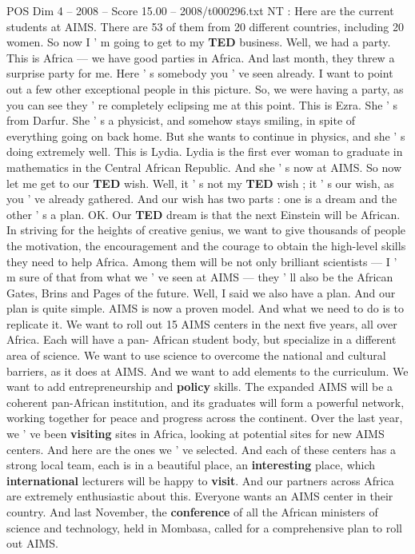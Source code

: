 \begin{textsample}{POS Dim 4 – 2008 – Score 15.00 – 2008/t000296.txt}
NT : Here are the current students at AIMS.
There are 53 of them from 20 different countries, including 20 women.
So now I ' m going to get to my \textbf{TED} business.
Well, we had a party.
This is Africa — we have good parties in Africa.
And last month, they threw a surprise party for me.
Here ' s somebody you ' ve seen already.
I want to point out a few other exceptional people in this picture.
So, we were having a party, as you can see they ' re completely eclipsing me at this point.
This is Ezra.
She ' s from Darfur.
She ' s a physicist, and somehow stays smiling, in spite of everything going on back home.
But she wants to continue in physics, and she ' s doing extremely well.
This is Lydia.
Lydia is the first ever woman to graduate in mathematics in the Central African Republic.
And she ' s now at AIMS.
So now let me get to our \textbf{TED} wish.
Well, it ' s not my \textbf{TED} wish ; it ' s our wish, as you ' ve already gathered.
And our wish has two parts : one is a dream and the other ' s a plan.
OK.
Our \textbf{TED} dream is that the next Einstein will be African.
In striving for the heights of creative genius, we want to give thousands of people the motivation, the encouragement and the courage to obtain the high-level skills they need to help Africa.
Among them will be not only brilliant scientists — I ' m sure of that from what we ' ve seen at AIMS — they ' ll also be the African Gates, Brins and Pages of the future.
Well, I said we also have a plan.
And our plan is quite simple.
AIMS is now a proven model.
And what we need to do is to replicate it.
We want to roll out 15 AIMS centers in the next five years, all over Africa.
Each will have a pan- African student body, but specialize in a different area of science.
We want to use science to overcome the national and cultural barriers, as it does at AIMS.
And we want to add elements to the curriculum.
We want to add entrepreneurship and \textbf{policy} skills.
The expanded AIMS will be a coherent pan-African institution, and its graduates will form a powerful network, working together for peace and progress across the continent.
Over the last year, we ' ve been \textbf{visiting} sites in Africa, looking at potential sites for new AIMS centers.
And here are the ones we ' ve selected.
And each of these centers has a strong local team, each is in a beautiful place, an \textbf{interesting} place, which \textbf{international} lecturers will be happy to \textbf{visit}.
And our partners across Africa are extremely enthusiastic about this.
Everyone wants an AIMS center in their country.
And last November, the \textbf{conference} of all the African ministers of science and technology, held in Mombasa, called for a comprehensive plan to roll out AIMS.

\end{textsample}
